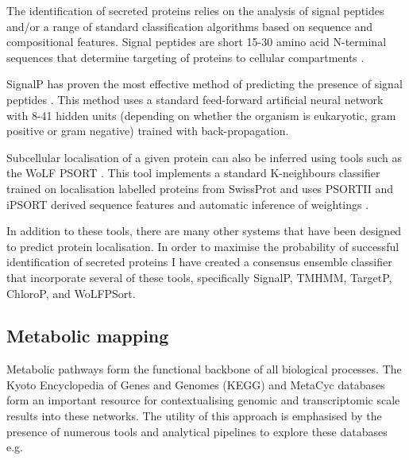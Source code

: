 
The identification of secreted proteins relies on the analysis
of signal peptides and/or a range of standard classification
algorithms based on sequence and compositional features.   
Signal peptides are short 15-30 amino acid N-terminal sequences
that determine targeting of proteins to cellular compartments
\citep{Schatz1996,Rusch1995}.

SignalP \citep{Nielsen1997} has proven the most effective method of predicting
the presence of signal peptides \citep{Lee2009a,Petersen2011}.
This method uses a standard feed-forward artificial neural network
with 8-41 hidden units (depending on whether the organism is eukaryotic, 
gram positive or gram negative) trained with back-propagation.

Subcellular localisation of a given protein can also be inferred
using tools such as the WoLF PSORT \citep{Horton2007a}.
This tool implements a standard K-neighbours classifier
trained on localisation labelled proteins from SwissProt 
and uses PSORTII \citep{Nakai1992,Nakai1999,Horton1997} and iPSORT \citep{Bannai2002} 
derived sequence features and automatic inference of weightings \citep{Horton2006}. 

In addition to these tools, there are many other systems that have been
designed to predict protein localisation.  In order to maximise
the probability of successful identification of secreted proteins I have
created a consensus ensemble classifier that incorporate several of these
tools, specifically SignalP, TMHMM, TargetP, ChloroP, and WoLFPSort. 
%
%
%
%

\subsection{Metabolic mapping}

Metabolic pathways form the functional backbone of all biological processes. 
The Kyoto Encyclopedia of Genes and Genomes (KEGG) \citep{Ogata1999,Okuda2008,Kanehisa2014} 
and MetaCyc \citep{Caspi2007} databases form an important resource for contextualising
genomic and transcriptomic scale results into these networks. 
The utility of this approach is emphasised by the presence of numerous
tools and analytical pipelines to explore these databases 
e.g. \citep{Okuda2008,Nakao1999,Karp2002,Karp2010,Antonov2008,Klukas2007}

